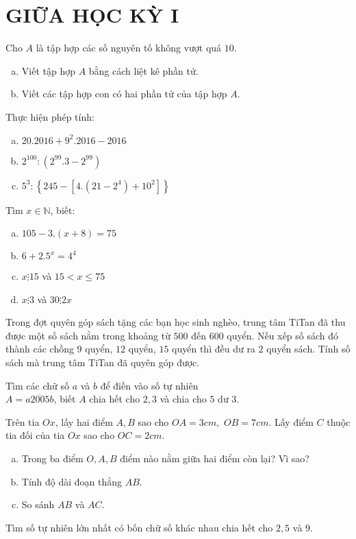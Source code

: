 \section{GIỮA HỌC KỲ I}
\setcounter{ex}{0}
\begin{ex}
Cho $A$ là tập hợp các số nguyên tố không vượt quá $10$. 
	\begin{enumerate}[a)]
	\item Viết tập hợp $A$ bằng cách liệt kê phần tử.
	\item Viết các tập hợp con có hai phần tử của tập hợp $A$.
	\end{enumerate}
\end{ex}
\begin{ex}
	Thực hiện phép tính:
	\begin{enumerate}[a)]
\item $20.2016+{{9}^{2}}.2016-2016$ 
\item ${{2}^{100}}:\left( {{2}^{99}}.3-{{2}^{99}} \right)$
\item ${{5}^{3}}:\left\{ 245-\left[ 4.\left( 21-{{2}^{4}} \right)+{{10}^{2}} \right] \right\}$ 
	\end{enumerate}
\end{ex}
\begin{ex}
	Tìm $x \in \mathbb{N}$, biết:
	\begin{enumerate}[a)]
\item $105-3.\left( x+8 \right)=75$ 
\item $6+{{2.5}^{x}}={{4}^{4}}$ 
\item $x\vdots 15$ và  $15<x\le 75$  
\item $x\vdots 3$  và   $30\vdots 2x$   
	\end{enumerate}
\end{ex}
\begin{ex}
	Trong đợt quyên góp sách tặng các bạn học sinh nghèo, trung tâm TiTan đã thu được một số sách nằm trong khoảng từ $500$ đến $600$ quyển. Nếu xếp số sách đó thành các chồng $9$ quyển, $12$ quyển, $15$ quyển thì đều dư ra $2$ quyển sách. Tính số sách mà trung tâm TiTan đã quyên góp được.
\end{ex}
\begin{ex}
Tìm các chữ số $a$ và $b$ để điền vào số tự nhiên\\ $A=\overline{a2005b}$, biết $A$ chia hết cho $2, 3$ và chia cho $5$ dư $3$.
\end{ex}
\begin{ex}
	Trên tia $Ox$, lấy hai điểm $A, B$ sao cho $OA=3cm,\,\,OB=7cm$. Lấy điểm $C$ thuộc tia đối của tia $Ox$ sao cho $OC=2cm$. 
	\begin{enumerate}[a)]
	\item Trong ba điểm $O, A, B$ điểm nào nằm giữa hai điểm còn lại? Vì sao? 
\item Tính độ dài đoạn thẳng $AB$.
\item So sánh $AB$ và $AC$. 

	\end{enumerate}
\end{ex}
\begin{ex}
	Tìm số tự nhiên lớn nhất có bốn chữ số khác nhau chia hết cho $2, 5$ và $9$.
\end{ex}